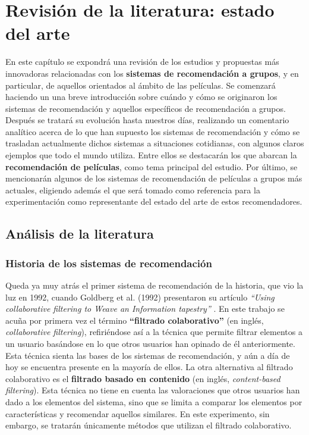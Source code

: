 \chapter{Revisión de la literatura: estado del arte}

En este capítulo se expondrá una revisión de los estudios y propuestas más innovadoras relacionadas con los \textbf{sistemas de recomendación a grupos}, y en particular, de aquellos orientados al ámbito de las películas. Se comenzará haciendo un una breve introducción sobre cuándo y cómo se originaron los sistemas de recomendación y aquellos específicos de recomendación a grupos. Después se tratará su evolución hasta nuestros días, realizando un comentario analítico acerca de lo que han supuesto los sistemas de recomendación y cómo se trasladan actualmente dichos sistemas a situaciones cotidianas, con algunos claros ejemplos que todo el mundo utiliza. Entre ellos se destacarán los que abarcan la \textbf{recomendación de películas}, como tema principal del estudio. Por último, se mencionarán algunos de los sistemas de recomendación de películas a grupos más actuales, eligiendo además el que será tomado como referencia para la experimentación como representante del estado del arte de estos recomendadores.

\section{Análisis de la literatura}

\subsection{Historia de los sistemas de recomendación}

Queda ya muy atrás el primer sistema de recomendación de la historia, que vio la luz en 1992, cuando Goldberg et al. (1992) presentaron su artículo \textit{``Using collaborative filtering to Weave an Information tapestry''} \cite{tapestry-goldberg}. En este trabajo se acuña por primera vez el término \textbf{``filtrado colaborativo''} \cite{filtering-strategies} (en inglés, \textit{collaborative filtering}), refiriéndose así a la técnica que permite filtrar elementos a un usuario basándose en lo que otros usuarios han opinado de él anteriormente. Esta técnica sienta las bases de los sistemas de recomendación, y aún a día de hoy se encuentra presente en la mayoría de ellos. La otra alternativa al filtrado colaborativo es el \textbf{filtrado basado en contenido} \cite{filtering-strategies} (en inglés, \textit{content-based filtering}). Esta técnica no tiene en cuenta las valoraciones que otros usuarios han dado a los elementos del sistema, sino que se limita a comparar los elementos por características y recomendar aquellos similares. En este experimento, sin embargo, se tratarán únicamente métodos que utilizan el filtrado colaborativo.

